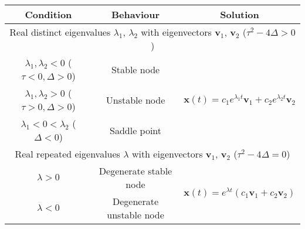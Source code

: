 \documentclass{article}
\begin{document}
\begin{table}[H]
    \centering
    \begin{tabular}{ccc}
        \toprule
        \textbf{Condition}                                      & \textbf{Behaviour}       & \textbf{Solution}                                                                                                                                                       \\
        \midrule
        \multicolumn{3}{c}{Real distinct eigenvalues \(\lambda_1\), \(\lambda_2\) with eigenvectors \(\symbf{v}_1\), \(\symbf{v}_2\) (\(\tau^2 - 4\Delta > 0\))}                                                                                                     \\
        \midrule
        \(\lambda_1, \lambda_2 < 0\) (\(\tau < 0, \Delta > 0\)) & Stable node              & \multirow{3}{*}{\(\symbf{x}\left( t \right) = c_1 e^{\lambda_1 t} \symbf{v}_1 + c_2 e^{\lambda_2 t} \symbf{v}_2\)}                                                      \\
        \(\lambda_1, \lambda_2 > 0\) (\(\tau > 0, \Delta > 0\)) & Unstable node            &                                                                                                                                                                         \\
        \(\lambda_1 < 0 < \lambda_2\) (\(\Delta < 0\))          & Saddle point             &                                                                                                                                                                         \\
        \midrule
        \multicolumn{3}{c}{Real repeated eigenvalues \(\lambda\) with eigenvectors \(\symbf{v}_1\), \(\symbf{v}_2\) (\(\tau^2 - 4\Delta = 0\))}                                                                                                                      \\
        \midrule
        \(\lambda > 0\)                                         & Degenerate stable node   & \multirow{2}{*}{\(\symbf{x}\left( t \right) = e^{\lambda t} \left( c_1 \symbf{v}_1 + c_2 \symbf{v}_2 \right)\)}                                                         \\
        \(\lambda < 0\)                                         & Degenerate unstable node &                                                                                                                                                                         \\

\end{tabular}
\end{table}
\end{document}
